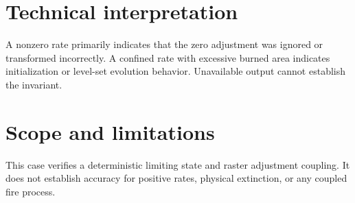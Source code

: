 \section{Technical interpretation}

A nonzero rate primarily indicates that the zero adjustment was ignored or transformed incorrectly. A confined rate with excessive burned area indicates initialization or level-set evolution behavior. Unavailable output cannot establish the invariant.

\section{Scope and limitations}

This case verifies a deterministic limiting state and raster adjustment coupling. It does not establish accuracy for positive rates, physical extinction, or any coupled fire process.

